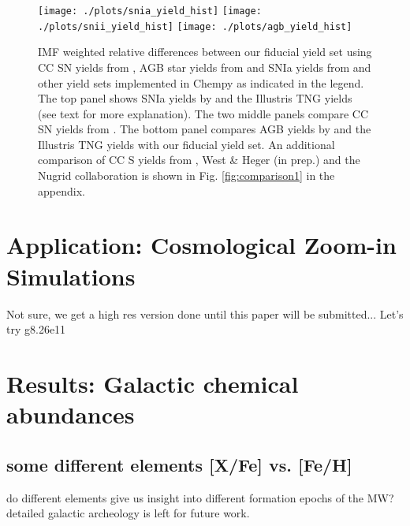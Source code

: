 \documentclass[useAMS,usenatbib]{mnras}
\begin{document}
\begin{figure*}
\begin{center}
\texttt{[image: ./plots/snia\_yield\_hist]}
\texttt{[image: ./plots/snii\_yield\_hist]}
\texttt{[image: ./plots/agb\_yield\_hist]}
\end{center}
\vspace{-.35cm}
\caption{IMF weighted relative differences between our fiducial yield set using CC SN yields from \citet{Chieffi2004}, AGB star yields from \citet{Karakas2016} and SNIa yields from \citet{Seitenzahl2013} and other yield sets implemented in Chempy as indicated in the legend. The top panel shows SNIa yields by \citet{Iwamoto1999,Thielemann2003} and the Illustris TNG yields (see text for more explanation). The two middle panels compare CC SN yields from \citet{Limongi2018,Nomoto2013,Portinari1998}. The bottom panel compares AGB yields by \citet{Ventura2013,Pignatari2016} and the Illustris TNG yields with our fiducial yield set. An additional comparison of CC S yields from \citet{Frischknecht2016}, West \& Heger (in prep.) and the Nugrid collaboration \citep{Ritter2018} is shown in Fig. \ref{fig:comparison1} in the appendix.}
\label{fig:comparison}
\end{figure*}




\section{Application: Cosmological Zoom-in Simulations} \label{sec:simulation}

Not sure, we get a high res version done until this paper will be submitted...
Let's try g8.26e11

\section{Results: Galactic chemical abundances}
\label{sec:}


\subsection{some different elements [X/Fe] vs. [Fe/H]}
do different elements give us insight into different formation epochs of the MW?
detailed galactic archeology is left for future work.
\end{document}
